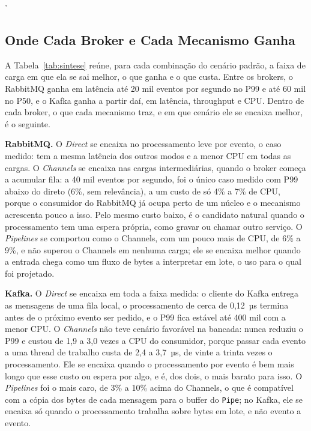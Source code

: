 '\documentclass[12pt]{article}
\begin{document}
\subsection{Onde Cada Broker e Cada Mecanismo Ganha}
\label{sec:sintese}

A Tabela~\ref{tab:sintese} reúne, para cada combinação do cenário padrão, a faixa de
carga em que ela se sai melhor, o que ganha e o que custa. Entre os brokers, o RabbitMQ
ganha em latência até 20 mil eventos por segundo no P99 e até 60 mil no P50, e o Kafka
ganha a partir daí, em latência, throughput e CPU. Dentro de cada broker, o que cada
mecanismo traz, e em que cenário ele se encaixa melhor, é o seguinte.

\textbf{RabbitMQ.} O \textit{Direct} se encaixa no processamento leve por evento, o caso
medido: tem a mesma latência dos outros modos e a menor CPU em todas as cargas. O
\textit{Channels} se encaixa nas cargas intermediárias, quando o broker começa a acumular
fila: a 40 mil eventos por segundo, foi o único caso medido com P99 abaixo do direto (6\%,
sem relevância), a um custo de só 4\% a 7\% de CPU, porque o consumidor do RabbitMQ já
ocupa perto de um núcleo e o mecanismo acrescenta pouco a isso. Pelo mesmo custo baixo, é o
candidato natural quando o processamento tem uma espera própria, como gravar ou chamar outro
serviço. O \textit{Pipelines} se comportou como o Channels, com um pouco mais de CPU, de 6\%
a 9\%, e não superou o Channels em nenhuma carga; ele se encaixa melhor quando a entrada
chega como um fluxo de bytes a interpretar em lote, o uso para o qual foi projetado.

\textbf{Kafka.} O \textit{Direct} se encaixa em toda a faixa medida: o cliente do Kafka
entrega as mensagens de uma fila local, o processamento de cerca de 0,12~µs termina antes
de o próximo evento ser pedido, e o P99 fica estável até 400 mil com a menor CPU. O
\textit{Channels} não teve cenário favorável na bancada: nunca reduziu o P99 e custou de
1,9 a 3,0 vezes a CPU do consumidor, porque passar cada evento a uma thread de trabalho
custa de 2,4 a 3,7~µs, de vinte a trinta vezes o processamento. Ele se encaixa quando o
processamento por evento é bem mais longo que esse custo ou espera por algo, e é, dos dois,
o mais barato para isso. O \textit{Pipelines} foi o mais caro, de 3\% a 10\% acima do
Channels, o que é compatível com a cópia dos bytes de cada mensagem para o buffer do
\texttt{Pipe}; no Kafka, ele se encaixa só quando o processamento trabalha sobre bytes em
lote, e não evento a evento.
\end{document}
